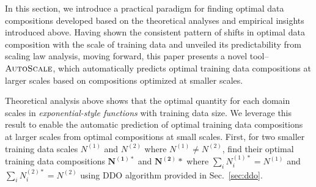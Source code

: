 \documentclass{article} %
\begin{document}
\begin{figure}\vspace{-1.75em}
    \vspace{-1em}
  \end{figure}


In this section, we introduce a practical paradigm for finding optimal data compositions developed based on the theoretical analyses and empirical insights introduced above. Having shown the consistent pattern of shifts in optimal data composition with the scale of training data and unveiled its predictability from scaling law analysis, moving forward, this paper presents a novel tool–$\textsc{AutoScale}$, which automatically predicts optimal training data compositions at larger scales based on compositions optimized at smaller scales. 

Theoretical analysis above shows that the optimal quantity for each domain scales in \textit{exponential-style functions} with training data size. 
We leverage this result to enable the automatic prediction of optimal training data compositions at larger scales from optimal compositions at small scales.
First, for two smaller training data scales $N^{(1)}$ and $N^{(2)}$ where $N^{(1)} \neq N^{(2)}$, find their optimal training data compositions $\mathbf{N^{(1)*}}$ and $\mathbf{N^{(2)}*}$ where $\sum_i N_i^{(1)*}=N^{(1)}$ and $\sum_i N_i^{(2)*}=N^{(2)}$ using \textsc{DDO} algorithm provided in Sec.~\ref{sec:ddo}. %
\end{document}
